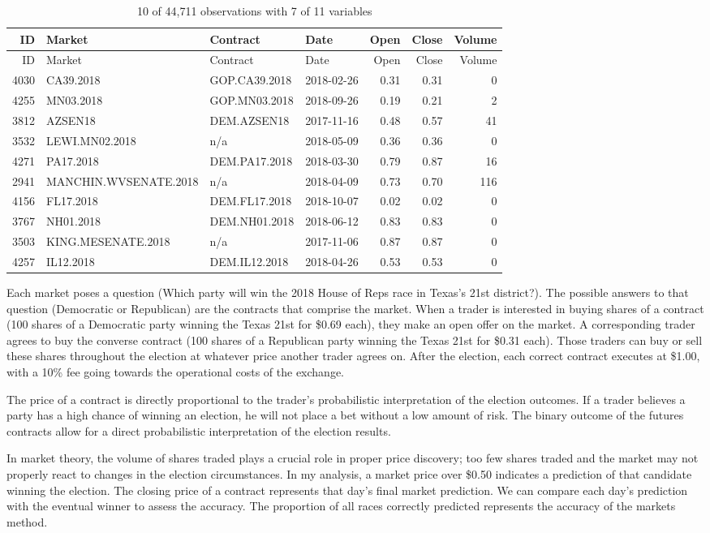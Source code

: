 \documentclass[]{article}
\begin{document}
\begin{longtable}[]{@{}rlllrrr@{}}
\caption{10 of 44,711 observations with 7 of 11
variables}\tabularnewline
\toprule
ID & Market & Contract & Date & Open & Close & Volume\tabularnewline
\midrule
\endfirsthead
\toprule
ID & Market & Contract & Date & Open & Close & Volume\tabularnewline
\midrule
\endhead
4030 & CA39.2018 & GOP.CA39.2018 & 2018-02-26 & 0.31 & 0.31 &
0\tabularnewline
4255 & MN03.2018 & GOP.MN03.2018 & 2018-09-26 & 0.19 & 0.21 &
2\tabularnewline
3812 & AZSEN18 & DEM.AZSEN18 & 2017-11-16 & 0.48 & 0.57 &
41\tabularnewline
3532 & LEWI.MN02.2018 & n/a & 2018-05-09 & 0.36 & 0.36 &
0\tabularnewline
4271 & PA17.2018 & DEM.PA17.2018 & 2018-03-30 & 0.79 & 0.87 &
16\tabularnewline
2941 & MANCHIN.WVSENATE.2018 & n/a & 2018-04-09 & 0.73 & 0.70 &
116\tabularnewline
4156 & FL17.2018 & DEM.FL17.2018 & 2018-10-07 & 0.02 & 0.02 &
0\tabularnewline
3767 & NH01.2018 & DEM.NH01.2018 & 2018-06-12 & 0.83 & 0.83 &
0\tabularnewline
3503 & KING.MESENATE.2018 & n/a & 2017-11-06 & 0.87 & 0.87 &
0\tabularnewline
4257 & IL12.2018 & DEM.IL12.2018 & 2018-04-26 & 0.53 & 0.53 &
0\tabularnewline
\bottomrule
\end{longtable}

Each market poses a question (Which party will win the 2018 House of
Reps race in Texas's 21st district?). The possible answers to that
question (Democratic or Republican) are the contracts that comprise the
market. When a trader is interested in buying shares of a contract (100
shares of a Democratic party winning the Texas 21st for \$0.69 each),
they make an open offer on the market. A corresponding trader agrees to
buy the converse contract (100 shares of a Republican party winning the
Texas 21st for \$0.31 each). Those traders can buy or sell these shares
throughout the election at whatever price another trader agrees on.
After the election, each correct contract executes at \$1.00, with a
10\% fee going towards the operational costs of the exchange.

The price of a contract is directly proportional to the trader's
probabilistic interpretation of the election outcomes. If a trader
believes a party has a high chance of winning an election, he will not
place a bet without a low amount of risk. The binary outcome of the
futures contracts allow for a direct probabilistic interpretation of the
election results.

In market theory, the volume of shares traded plays a crucial role in
proper price discovery; too few shares traded and the market may not
properly react to changes in the election circumstances. In my analysis,
a market price over \$0.50 indicates a prediction of that candidate
winning the election. The closing price of a contract represents that
day's final market prediction. We can compare each day's prediction with
the eventual winner to assess the accuracy. The proportion of all races
correctly predicted represents the accuracy of the markets method.
\end{document}
